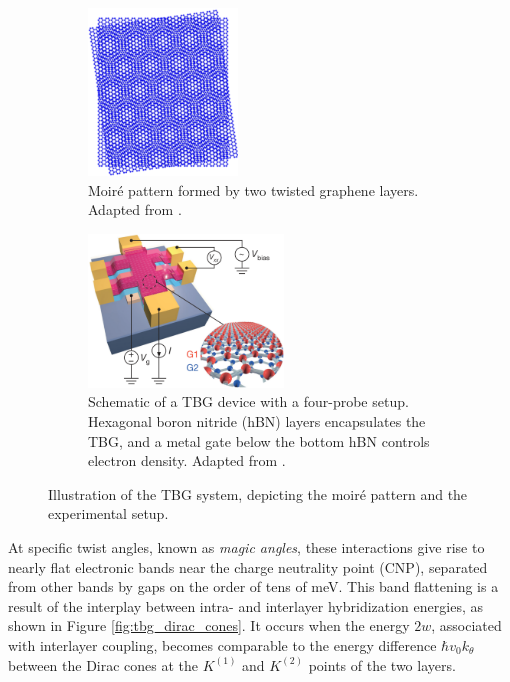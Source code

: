 \begin{figure}[H]
\centering
\begin{subfigure}{.37\textwidth}
  \centering
  \includegraphics[height=12em]{fig/moire_pattern.png}
  \caption{Moiré pattern formed by two twisted graphene layers. Adapted from \cite{moire_pattern_figure2021}.}
  \label{fig:moire_pattern}
\end{subfigure} \hfill
\begin{subfigure}{.60\textwidth}
  \centering
  \includegraphics[height=11em]{fig/tbg_device2.png}
  \caption{Schematic of a TBG device with a four-probe setup. Hexagonal boron nitride (hBN) layers encapsulates the TBG, and a metal gate below the bottom hBN controls electron density. Adapted from \cite{cao2018}.}
  \label{fig:tbg_device2}
\end{subfigure}
\caption{Illustration of the TBG system, depicting the moiré pattern and the experimental setup.}
\label{fig:tbg_moire_device}
\end{figure}

At specific twist angles, known as \textit{magic angles}, these interactions give rise to nearly flat electronic bands near the charge neutrality point (CNP), separated from other bands by gaps on the order of tens of meV. This band flattening is a result of the interplay between intra- and interlayer hybridization energies, as shown in Figure \ref{fig:tbg_dirac_cones}. It occurs when the energy \(2w\), associated with interlayer coupling, becomes comparable to the energy difference \(\hbar v_0 k_\theta\) between the Dirac cones at the \(K^{(1)}\) and \(K^{(2)}\) points of the two layers.

